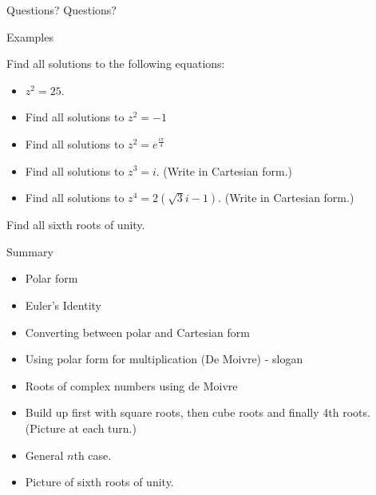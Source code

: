\documentclass{beamer}
\begin{document}
\begin{frame}{Questions?}
Questions?
\end{frame}

\begin{frame}{Examples}
\begin{example}
Find all solutions to the following equations:
\begin{itemize}
	\item $z^2 = 25$. %
	\item Find all solutions to $z^2 = -1$ %
	\item Find all solutions to $z^2 = e^{\frac{i\pi}{4}}$ %
	\item Find all solutions to $z^3 = i$. (Write in Cartesian form.) %
	\item Find all solutions to $z^4 = 2(\sqrt{3}i-1)$. (Write in Cartesian form.) %
\end{itemize}
\end{example}
\begin{example}
Find all sixth roots of unity.
\end{example}
\end{frame}

\begin{frame}{Summary}
\begin{itemize}
	\item Polar form
	\item Euler's Identity
	\item Converting between polar and Cartesian form
	\item Using polar form for multiplication (De Moivre) - slogan
	\item Roots of complex numbers using de Moivre
	\item Build up first with square roots, then cube roots and finally 4th roots. (Picture at each turn.)
	\item General $n$th case.
	\item Picture of sixth roots of unity.
\end{itemize}
\end{frame}
\end{document}
